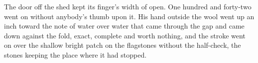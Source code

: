 The door off the shed kept its finger's width of open. One hundred and forty-two went on without anybody's thumb upon it. His hand outside the wool went up an inch toward the note of water over water that came through the gap and came down against the fold, exact, complete and worth nothing, and the stroke went on over the shallow bright patch on the flagstones without the half-check, the stones keeping the place where it had stopped.
